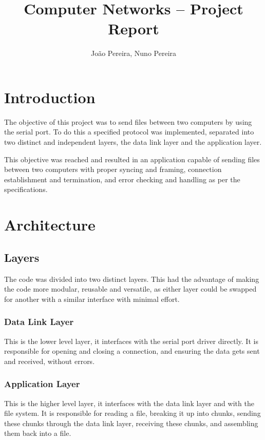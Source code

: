 \documentclass[11pt,a4paper,twocolumn]{article}
\title{Computer Networks -- \nth{1} Project Report}
\author{João Pereira, Nuno Pereira}
\begin{document}
\maketitle

\section{Introduction}

The objective of this project was to send files between two computers by using the serial port.
To do this a specified protocol was implemented, separated into two distinct and independent layers, the data link layer and the application layer.

This objective was reached and resulted in an application capable of sending files between two computers with proper syncing and framing, connection establishment and termination, and error checking and handling as per the specifications.

\section{Architecture}

\subsection{Layers}

The code was divided into two distinct layers.
This had the advantage of making the code more modular, reusable and versatile, as either layer could be swapped for another with a similar interface with minimal effort.

\subsubsection{Data Link Layer}

This is the lower level layer, it interfaces with the serial port driver directly.
It is responsible for opening and closing a connection, and ensuring the data gets sent and received, without errors.

\subsubsection{Application Layer}

This is the higher level layer, it interfaces with the data link layer and with the file system.
It is responsible for reading a file, breaking it up into chunks, sending these chunks through the data link layer, receiving these chunks, and assembling them back into a file.
\end{document}
